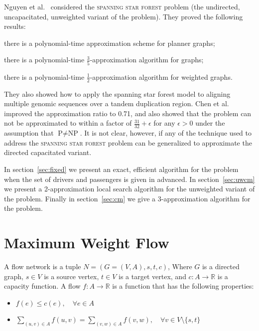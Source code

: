 \documentclass[draft]{article}
\def\R{\mathbb{R}}
\begin{document}
Nguyen et al.~\cite{nguyen2008approximating} considered the \textsc{spanning star forest} problem
(the undirected, uncapacitated, unweighted variant of the problem).
They proved the following results:
\begin{enumerate*}
\item
there is a polynomial-time approximation scheme for planner graphs;
\item 
there is a polynomial-time $\frac{3}{5}$-approximation algorithm for graphs;
\item 
there is a polynomial-time $\frac{1}{2}$-approximation algorithm for weighted graphs.
\end{enumerate*}
They also showed how to apply the spanning star forest model to aligning multiple
genomic sequences over a tandem duplication region.
Chen et al.~\cite{chen2007improved} improved the approximation ratio to 0.71,
and also showed that the problem can not be approximated to within a factor of
$\frac{31}{32} + \epsilon$ for any $\epsilon > 0$ under the assumption 
that $\text{P} \neq \text{NP}$.
It is not clear, however, if any of the technique used to address the
\textsc{spanning star forest} problem can be generalized to approximate the
directed capacitated variant.

In section~\ref{sec:fixed} we present an exact, efficient algorithm for the
problem when the set of drivers and passengers is given in advanced.
In section~\ref{sec:uwcm} we present a 2-approximation local search algorithm
for the unweighted variant of the problem.
Finally in section~\ref{sec:cm} we
give a 3-approximation algorithm for the problem.

\section{Maximum Weight Flow}
\label{sec:carpool:preliminary}
A flow network is a tuple $N = (G = (V, A), s, t, c)$, 
Where $G$ is a directed graph, 
$s \in V$ is a source vertex, 
$t \in V$ is a target vertex, 
and $c : A \rightarrow \R$ is a capacity function. 
A flow $f : A \rightarrow \R$ is a function that has the following properties:
\begin{itemize}
\item
$f(e) \leq c(e), \quad \forall e \in A$

\item
$\sum_{(u, v) \in A} f(u, v) = \sum_{(v, w) \in A} f(v, w), \quad \forall v \in V \setminus \{s, t\}$
\end{itemize}
\end{document}
